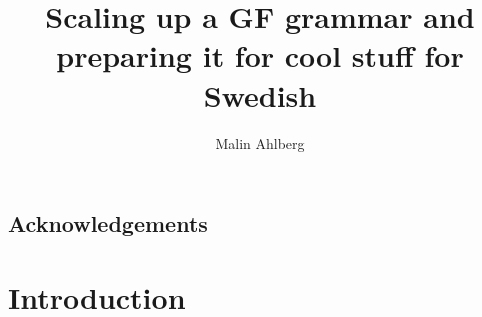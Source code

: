 \documentclass{report}
\begin{document}
\title{Scaling up a GF grammar and preparing it for cool stuff for Swedish}
\author{Malin Ahlberg}
\maketitle
\newpage

\tableofcontents
\newpage

\abstract{

}

\newpage

\section*{Acknowledgements}

\newpage
\chapter{Introduction}
\end{document}

